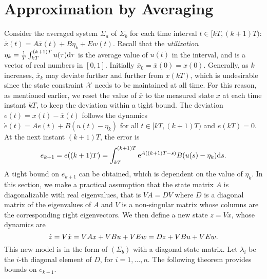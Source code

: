 \section{Approximation by Averaging} %
\label{sec:averaged-system}

Consider the averaged system $\Sigma_a$ of $\Sigma_b$ for each time interval $t \in [kT, (k + 1) T)$: $\dot{\overbar{x}} (t) = A \overbar{x} (t) + B \eta_k + Ew (t)$.
Recall that the \emph{utilization} $\eta_k = \frac{1}{T} \int_{kT}^{(k + 1) T} u (\tau) \mathrm{d} \tau$ is the average value of $u(t)$ in the interval, and is a vector of real numbers in $[0, 1]$. %
Initially $\overbar{x}_{0} = \overbar{x} (0) = x(0)$.
Generally, as $k$ increases, $\overbar{x}_{k}$ may deviate further and further from $x (kT)$, which is undesirable since the state constraint $\mathcal{X}$ needs to be maintained at all time.
For this reason, as mentioned earlier, we reset the value of $\overbar{x}$ to the measured state $x$ at each time instant $kT$, to keep the deviation within a tight bound.
The deviation $e (t) = x (t) - \overbar{x} (t)$ follows the dynamics
\begin{math}
  \dot{e} (t) %
  = Ae (t) + B (u (t) - \eta_k) \label{eq:err-dynamics}
\end{math}
for all $t \in [kT, (k + 1) T)$ and $e (kT) = 0$.
At the next instant $(k + 1) T$, the error is %
\begin{equation*}
e_{k+1} = e ((k + 1) T) = \int_{kT}^{(k + 1) T} \mathrm{e}^{A ((k + 1) T - s)} B (u (s) - \eta_k) \mathrm{d} s \text.
\end{equation*}
A tight bound on $e_{k+1}$ can be obtained, which is dependent on the value of $\eta_k$.
In this section, we make a practical assumption that the
state matrix $A$ is diagonalizable with real eigenvalues, that is $VA = DV$
where $D$ is a diagonal matrix of the eigenvalues of $A$ and $V$ is a non-singular matrix whose columns are the corresponding right eigenvectors.
We then %
define a new state $z = Vx$, whose dynamics are
\[ \dot{z} = V \dot{x} = VAx + VBu + VEw = Dz + VBu + VEw \text.\]
This new model is in the form of $(\Sigma_b)$ with a diagonal state matrix.
Let $\lambda_i$ be the $i$-th diagonal element of $D$, for $i = 1, \ldots, n$.
The following theorem provides bounds on $e_{k+1}$. %

